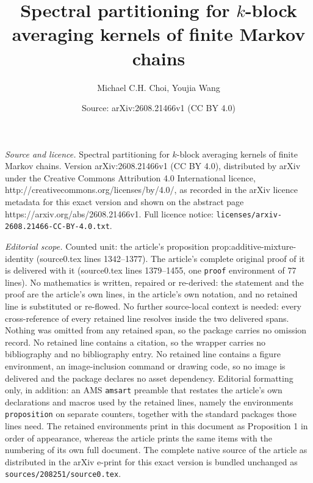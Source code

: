 \documentclass[10pt,a4paper]{amsart}
\title{Spectral partitioning for $k$-block averaging kernels of finite Markov chains}
\author{Michael C.H. Choi, Youjia Wang}
\date{Source: arXiv:2608.21466v1 (CC BY 4.0)}
\begin{document}
\maketitle

\noindent\emph{Source and licence.} Spectral partitioning for $k$-block averaging kernels of finite Markov chains. Version arXiv:2608.21466v1 (CC BY 4.0), distributed by arXiv under the Creative Commons Attribution 4.0 International licence, http://creativecommons.org/licenses/by/4.0/, as recorded in the arXiv licence metadata for this exact version and shown on the abstract page https://arxiv.org/abs/2608.21466v1. Full licence notice: \texttt{licenses/arxiv-2608.21466-CC-BY-4.0.txt}.\par\smallskip

\noindent\textit{Editorial scope.} Counted unit: the article's proposition prop:additive-mixture-identity (source0.tex lines 1342--1377). The article's complete original proof of it is delivered with it (source0.tex lines 1379--1455, one \texttt{proof} environment of 77 lines). No mathematics is written, repaired or re-derived: the statement and the proof are the article's own lines, in the article's own notation, and no retained line is substituted or re-flowed.  No further source-local context is needed: every cross-reference of every retained line resolves inside the two delivered spans.  Nothing was omitted from any retained span, so the package carries no omission record.  No retained line contains a citation, so the wrapper carries no bibliography and no bibliography entry.  No retained line contains a figure environment, an image-inclusion command or drawing code, so no image is delivered and the package declares no asset dependency.  Editorial formatting only, in addition: an AMS \texttt{amsart} preamble that restates the article's own declarations and macros used by the retained lines, namely the environments \texttt{proposition} on separate counters, together with the standard packages those lines need.  The retained environments print in this document as Proposition 1 in order of appearance, whereas the article prints the same items with the numbering of its own full document.  The complete native source of the article as distributed in the arXiv e-print for this exact version is bundled unchanged as \texttt{sources/208251/source0.tex}.
\end{document}
